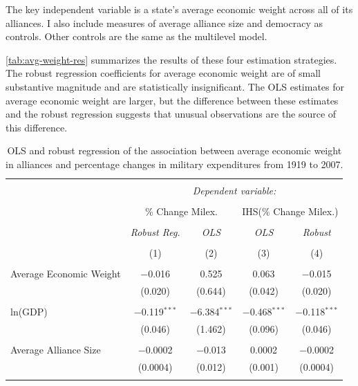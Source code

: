 \documentclass[12pt]{article}
\begin{document}
The key independent variable is a state's average economic weight across all of its alliances. 
I also include measures of average alliance size and democracy \citep{DigiuseppePoast2016} as controls. 
Other controls are the same as the multilevel model.  


\autoref{tab:avg-weight-res} summarizes the results of these four estimation strategies. 
The robust regression coefficients for average economic weight are of small substantive magnitude and are statistically insignificant. 
The OLS estimates for average economic weight are larger, but the difference between these estimates and the robust regression suggests that unusual observations are the source of this difference. 


\begin{table}[!htbp] \centering 
  \caption{OLS and robust regression of the association between average economic weight in alliances and percentage changes in military expenditures from 1919 to 2007.} 
  \label{tab:avg-weight-res} 
\begin{tabular}{@{\extracolsep{5pt}}lcccc} 
\\[-1.8ex]\hline 
\hline \\[-1.8ex] 
 & \multicolumn{4}{c}{\textit{Dependent variable:}} \\ 
\cline{2-5} 
\\[-1.8ex] & \multicolumn{2}{c}{\% Change Milex.} & \multicolumn{2}{c}{IHS(\% Change Milex.)} \\ 
\\[-1.8ex] & \textit{Robust Reg.} & \textit{OLS} & \textit{OLS} & \textit{Robust} \\ 
\\[-1.8ex] & (1) & (2) & (3) & (4)\\ 
\hline \\[-1.8ex] 
 Average Economic Weight & $-$0.016 & 0.525 & 0.063 & $-$0.015 \\ 
  & (0.020) & (0.644) & (0.042) & (0.020) \\ 
  & & & & \\ 
 ln(GDP) & $-$0.119$^{***}$ & $-$6.384$^{***}$ & $-$0.468$^{***}$ & $-$0.118$^{***}$ \\ 
  & (0.046) & (1.462) & (0.096) & (0.046) \\ 
  & & & & \\ 
 Average Alliance Size & $-$0.0002 & $-$0.013 & 0.0002 & $-$0.0002 \\ 
  & (0.0004) & (0.012) & (0.001) & (0.0004) \\ 
  & & & & \\ 

\end{tabular}
\end{table}
\end{document}
